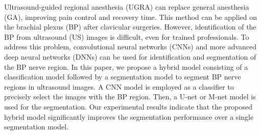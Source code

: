 Ultrasound-guided regional anesthesia (UGRA) can replace general anesthesia (GA), improving pain control and recovery time. This method can be applied on the brachial plexus (BP) after clavicular surgeries. However, identification of the BP from ultrasound (US) images is difficult, even for trained professionals. To address this problem, convolutional neural networks (CNNs) and more advanced deep neural networks (DNNs) can be used for identification and segmentation of the BP nerve region. In this paper, we propose a hybrid model consisting of a classification model followed by a segmentation model to segment BP nerve regions in ultrasound images. A CNN model is employed as a classifier to precisely select the images with the BP region. Then, a U-net or M-net model is used for the segmentation. Our experimental results indicate that the proposed hybrid model significantly improves the segmentation performance over a single segmentation model.
